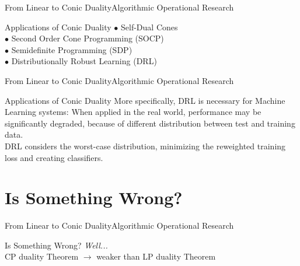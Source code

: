 \documentclass[11pt,aspectratio=169]{beamer}
\newcommand{\TT}{From Linear to Conic Duality}
\newcommand{\TL}{Algorithmic Operational Research}
\newcommand{\PIII}{Applications of Conic Duality}
\newcommand{\PIV}{Is Something Wrong?}
\begin{document}
\begin{frame}{\TT}{\TL}
 \begin{block}{\PIII}\pause
\Large
\hspace{2mm} $\bullet$ Self-Dual Cones \\
\hspace{2mm} $\bullet$ Second Order Cone Programming (SOCP) \\
\hspace{2mm} $\bullet$ Semidefinite Programming (SDP) \\
\hspace{2mm} $\bullet$ Distributionally Robust Learning (DRL) \\
 \end{block}
\end{frame}

\begin{frame}{\TT}{\TL}
 \begin{block}{\PIII}
\Large
More specifically, DRL is necessary for Machine Learning systems: When applied in the real world, performance may be significantly degraded, because of different distribution between test and training data. \\ DRL considers the worst-case distribution, minimizing the reweighted training loss and creating classifiers.
 \end{block}
\end{frame}

\section{\PIV}
\begin{frame}{\TT}{\TL}
 \begin{block}{\PIV}\pause
\Large
\textit{Well...}\newline \\
CP duality Theorem $\rightarrow$ weaker than LP duality Theorem
 \end{block}
\end{frame}
\end{document}
